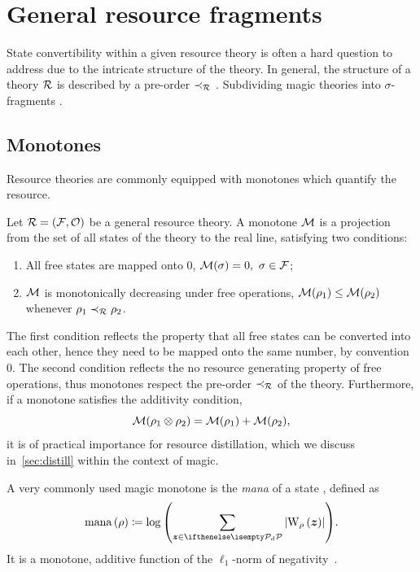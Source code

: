\section{General resource fragments}
\label{sec:frag}

State convertibility within a given resource theory is often a hard question to address due to the intricate structure of the theory.
In general, the structure of a theory $\mathcal{R}$ is described by a pre-order $\prec_{\mathcal{R}}$ .
Subdividing magic theories into $\sigma$-fragments .
\subsection{Monotones}\label{sec:mono}

Resource theories are commonly equipped with monotones which quantify the resource. 
\begin{definition}\label{def:mono}
    Let $\mathcal{R} = (\mathcal{F}, \mathcal{O})$ be a general resource theory.
    A monotone $\mathcal{M}$ is a projection from the set of all states of the theory to the real line, satisfying two conditions:
    \begin{enumerate}
        \item All free states are mapped onto 0, $\mathcal{M}(\sigma) = 0,\ \sigma \in \mathcal{F}$;
        \item $\mathcal{M}$ is monotonically decreasing under free operations, $\mathcal{M}(\rho_1) \leq \mathcal{M}(\rho_2)$ whenever $\rho_1 \prec_{\mathcal{R}} \rho_2$.
    \end{enumerate}
\end{definition}
The first condition reflects the property that all free states can be converted into each other, hence they need to be mapped onto the same number, by convention 0.
The second condition reflects the no resource generating property of free operations, thus monotones respect the pre-order $\prec_{\mathcal{R}}$ of the theory.
Furthermore, if a monotone satisfies the additivity condition,
\begin{equation}
    \mathcal{M}(\rho_1 \otimes \rho_2) = \mathcal{M}(\rho_1) + \mathcal{M}(\rho_2),
\end{equation}
it is of practical importance for resource distillation, which we discuss in~\cref{sec:distill} within the context of magic.

A very commonly used magic monotone is the \emph{mana} of a state , defined as
\begin{equation}
    \mana{\rho} \coloneqq \log{\left(\sum\limits_{\bmz \in \pd} \abs{\W[\bmz]{\rho}}\right)}.
\end{equation}
It is a monotone, additive function of the $\ell_1$-norm of negativity~.

